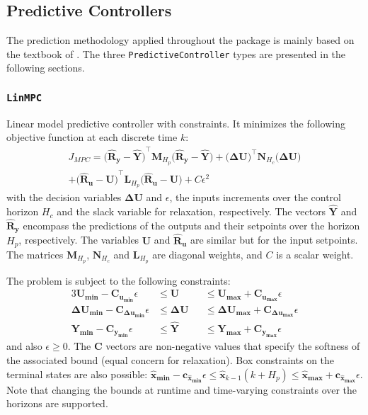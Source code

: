 \subsection{Predictive Controllers}

The prediction methodology applied throughout the package is mainly based on the textbook of \citet{mpcMac}. The three \texttt{PredictiveController} types are presented in the following sections.

\subsubsection{\textnormal{\texttt{LinMPC}}}
Linear model predictive controller with constraints. It minimizes the following objective function at each discrete time $k$:
\begin{multline}\label{eq:J_MPC}
J_{\mathit{MPC}} = 
    \mathbf{\big(\hat{R}_y - \hat{Y}\big)}^\intercal \mathbf{M}_{H_p} \mathbf{\big(\hat{R}_y - \hat{Y}\big)}   
    + \mathbf{\big(ΔU\big)}^\intercal \mathbf{N}_{H_c} \mathbf{\big(ΔU\big)} \\
    + \mathbf{\big(\hat{R}_u - U\big)}^\intercal \mathbf{L}_{H_p} \mathbf{\big(\hat{R}_u - U\big)} 
    + C \epsilon^2
\end{multline}
with the decision variables $\mathbf{ΔU}$ and $\epsilon$, the inputs increments over the control horizon $H_c$ and the slack variable for relaxation, respectively. The vectors $\mathbf{\hat{Y}}$ and $\mathbf{\hat{R}_y}$ encompass the predictions of the outputs and their setpoints over the horizon $H_p$, respectively. The variables $\mathbf{U}$ and $\mathbf{\hat{R}_u}$ are similar but for the input setpoints. The matrices $\mathbf{M}_{H_p}$, $\mathbf{N}_{H_c}$ and $\mathbf{L}_{H_p}$ are diagonal weights, and $C$ is a scalar weight. 

The problem is subject to the following constraints:
\begin{alignat}{3}
    \mathbf{U_{min}  - C_{u_{min}}}  \epsilon &\le \mathbf{U}  &&\le \mathbf{U_{max}  + C_{u_{max}}}  \epsilon \\
    \mathbf{ΔU_{min} - C_{Δu_{min}}} \epsilon &\le \mathbf{ΔU} &&\le \mathbf{ΔU_{max} + C_{Δu_{max}}} \epsilon \\
    \mathbf{Y_{min}  - C_{y_{min}}}  \epsilon &\le \mathbf{\hat{Y}} &&\le \mathbf{Y_{max}  + C_{y_{max}}}  \epsilon
\end{alignat}
and also $\epsilon \ge 0$. The $\mathbf{C}$ vectors are non-negative values that specify the softness of the associated bound (equal concern for relaxation). Box constraints on the terminal states are also possible: $\mathbf{\hat{x}_{min}} {-} \mathbf{c_{\hat{x}_{min}}}\epsilon \le \mathbf{\hat{x}}_{k-1}(k{+}H_p) \le \mathbf{\hat{x}_{max}} + \mathbf{c_{\hat{x}_{max}}}\epsilon$. Note that changing the bounds at runtime and time-varying constraints over the horizons are supported.

